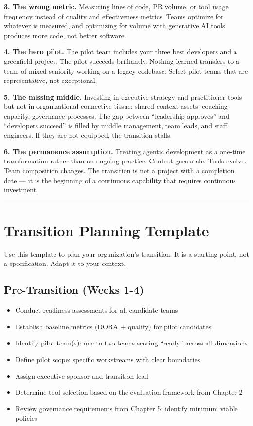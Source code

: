 \documentclass[
  a4paper,
  DIV=11,
  numbers=noendperiod]{scrreprt}
\providecommand{\tightlist}{%
  \setlength{\itemsep}{0pt}\setlength{\parskip}{0pt}}
\begin{document}
\textbf{3. The wrong metric.} Measuring lines of code, PR volume, or
tool usage frequency instead of quality and effectiveness metrics. Teams
optimize for whatever is measured, and optimizing for volume with
generative AI tools produces more code, not better software.

\textbf{4. The hero pilot.} The pilot team includes your three best
developers and a greenfield project. The pilot succeeds brilliantly.
Nothing learned transfers to a team of mixed seniority working on a
legacy codebase. Select pilot teams that are representative, not
exceptional.

\textbf{5. The missing middle.} Investing in executive strategy and
practitioner tools but not in organizational connective tissue: shared
context assets, coaching capacity, governance processes. The gap between
``leadership approves'' and ``developers succeed'' is filled by middle
management, team leads, and staff engineers. If they are not equipped,
the transition stalls.

\textbf{6. The permanence assumption.} Treating agentic development as a
one-time transformation rather than an ongoing practice. Context goes
stale. Tools evolve. Team composition changes. The transition is not a
project with a completion date --- it is the beginning of a continuous
capability that requires continuous investment.

\begin{center}\rule{0.5\linewidth}{0.5pt}\end{center}

\section{Transition Planning
Template}\label{transition-planning-template}

Use this template to plan your organization's transition. It is a
starting point, not a specification. Adapt it to your context.

\subsection{Pre-Transition (Weeks 1-4)}\label{pre-transition-weeks-1-4}

\begin{itemize}
\tightlist
\item[$\square$]
  Conduct readiness assessments for all candidate teams
\item[$\square$]
  Establish baseline metrics (DORA + quality) for pilot candidates
\item[$\square$]
  Identify pilot team(s): one to two teams scoring ``ready'' across all
  dimensions
\item[$\square$]
  Define pilot scope: specific workstreams with clear boundaries
\item[$\square$]
  Assign executive sponsor and transition lead
\item[$\square$]
  Determine tool selection based on the evaluation framework from
  Chapter 2
\item[$\square$]
  Review governance requirements from Chapter 5; identify minimum viable
  policies
\end{itemize}
\end{document}
